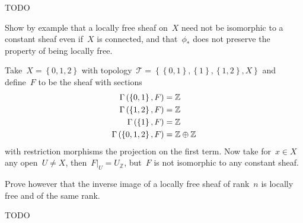 \documentclass[a4paper,11pt,oneside,openany,article]{memoir}
\begin{document}
\begin{enumerate}
    \begin{solution}
      TODO
    \end{solution}

    Show by example that a locally free sheaf on~$X$ need not be isomorphic to a constant sheaf even if~$X$ is connected, and that~$\phi_*$ does not preserve the property of being locally free.

    \begin{solution}
      Take~$X=\left\{ 0,1,2 \right\}$ with topology~$\mathcal{T}=\left\{ \left\{ 0,1 \right\},\left\{ 1 \right\},\left\{ 1,2 \right\},X \right\}$ and define~$F$ to be the sheaf with sections
      \begin{align}
        \mathrm{\Gamma}\left( \left\{ 0,1 \right\},F \right)&=\mathbb{Z} \\
        \mathrm{\Gamma}\left( \left\{ 1,2 \right\},F \right)&=\mathbb{Z} \\
        \mathrm{\Gamma}\left( \left\{ 1 \right\},F \right)&=\mathbb{Z} \\
        \mathrm{\Gamma}\left( \left\{ 0,1,2 \right\},F \right)&=\mathbb{Z}\oplus\mathbb{Z}
      \end{align}
      with restriction morphisms the projection on the first term. Now take for~$x\in X$ any open~$U\neq X$, then~$F|_U=U_\mathbb{Z}$, but~$F$ is not isomorphic to any constant sheaf.
      

    \end{solution}

    Prove however that the inverse image of a locally free sheaf of rank~$n$ is locally free and of the same rank.

    \begin{solution}
      TODO
    \end{solution}
\end{enumerate}



\end{document}
